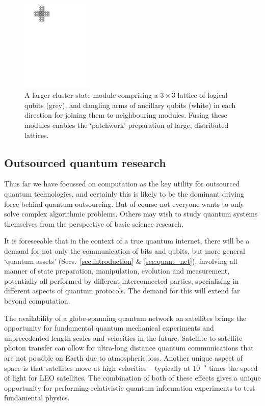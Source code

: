 \begin{figure}[!htbp]
\includegraphics[width=0.3\textwidth]{larger_module}
\captionspace \caption{A larger cluster state module comprising a \mbox{$3\times 3$} lattice of logical qubits (grey), and dangling arms of ancillary qubits (white) in each direction for joining them to neighbouring modules. Fusing these modules enables the `patchwork' preparation of large, distributed lattices.} \label{fig:larger_module}
\end{figure}

%
%

\subsection{Outsourced quantum research} 

Thus far we have focussed on computation as the key utility for outsourced quantum technologies, and certainly this is likely to be the dominant driving force behind quantum outsourcing. But of course not everyone wants to only solve complex algorithmic problems. Others may wish to study quantum systems themselves from the perspective of basic science research.

It is foreseeable that in the context of a true quantum internet, there will be a demand for not only the communication of bits and qubits, but more general `quantum assets' (Secs.~\ref{sec:introduction} \& \ref{sec:quant_net}), involving all manner of state preparation, manipulation, evolution and measurement, potentially all performed by different interconnected parties, specialising in different aspects of quantum protocols. The demand for this will extend far beyond computation.

The availability of a globe-spanning quantum network on satellites brings the opportunity for fundamental quantum mechanical experiments and unprecedented length scales and velocities in the future. Satellite-to-satellite photon transfer can allow for ultra-long distance quantum communications that are not possible on Earth due to atmospheric loss. Another unique aspect of space is that satellites move at high velocities -- typically at $10^{-5} $ times the speed of light for LEO satellites. The combination of both of these effects gives a unique opportunity for performing relativistic quantum information experiments to test fundamental physics. 

